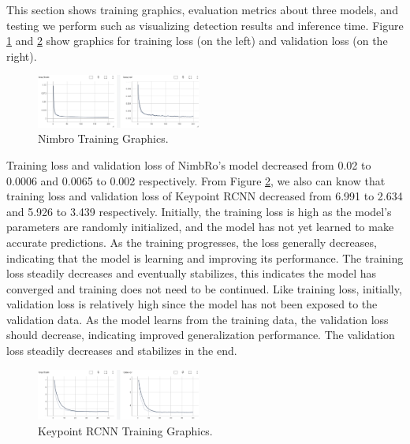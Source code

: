 This section shows training graphics, evaluation metrics about three models, and testing we perform such as visualizing detection results and inference time.
Figure \ref{fig:nimbro-training-graphics} and \ref{fig:rcnn-training-graphics} show graphics for training loss (on the left) and validation loss (on the right).
\begin{figure}[ht]
  \centering
  \includegraphics[width=0.48\textwidth]{gambar/loss-nimbro.png}
  \caption{Nimbro Training Graphics.}
  \label{fig:nimbro-training-graphics}
\end{figure}
Training loss and validation loss of NimbRo's model decreased from 0.02 to 0.0006 and 0.0065 to 0.002 respectively. From Figure \ref{fig:rcnn-training-graphics},
we also can know that training loss and validation loss of Keypoint RCNN decreased from 6.991 to 2.634 and 5.926 to 3.439 respectively. Initially, the training loss is high as the model's parameters are randomly initialized,
  and the model has not yet learned to make accurate predictions. As the training progresses, the loss generally decreases, indicating that the model is learning and improving its performance.
The training loss steadily decreases and eventually stabilizes, this indicates the model has converged and training does not need to be continued.
Like training loss, initially, validation loss is relatively high since the model has not been exposed to the validation data. As the model learns from the training data, the validation loss should decrease,
  indicating improved generalization performance. The validation loss steadily decreases and stabilizes in the end.
\begin{figure}[ht]
  \centering
  \includegraphics[width=0.48\textwidth]{gambar/loss-rcnn.png}
  \caption{Keypoint RCNN Training Graphics.}
  \label{fig:rcnn-training-graphics}
\end{figure}

